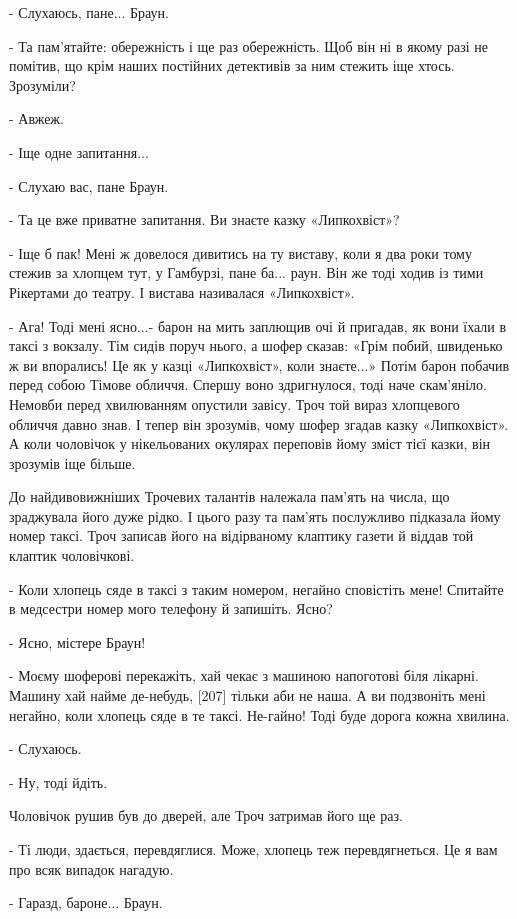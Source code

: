 - Слухаюсь, пане... Браун.

- Та пам'ятайте: обережність і ще раз обережність. Щоб він ні в якому разі не помітив, що крім наших постійних детективів за ним стежить іще хтось. Зрозуміли?

- Авжеж.

- Іще одне запитання...

- Слухаю вас, пане Браун.

- Та це вже приватне запитання. Ви знаєте казку «Липкохвіст»?

- Іще б пак! Мені ж довелося дивитись на ту виставу, коли я два роки тому стежив за хлопцем тут, у Гамбурзі, пане ба... раун. Він же тоді ходив із тими Рікертами до театру. І вистава називалася «Липкохвіст».

- Ага! Тоді мені ясно...- барон на мить заплющив очі й пригадав, як вони їхали в таксі з вокзалу. Тім сидів поруч нього, а шофер сказав: «Грім побий, швиденько ж ви впорались! Це як у казці «Липкохвіст», коли знаєте...» Потім барон побачив перед собою Тімове обличчя. Спершу воно здригнулося, тоді наче скам'яніло. Немовби перед хвилюванням опустили завісу. Троч той вираз хлопцевого обличчя давно знав. І тепер він зрозумів, чому шофер згадав казку «Липкохвіст». А коли чоловічок у нікельованих окулярах переповів йому зміст тієї казки, він зрозумів іще більше.

До найдивовижніших Трочевих талантів належала пам'ять на числа, що зраджувала його дуже рідко. І цього разу та пам'ять послужливо підказала йому номер таксі. Троч записав його на відірваному клаптику газети й віддав той клаптик чоловічкові.

- Коли хлопець сяде в таксі з таким номером, негайно сповістіть мене! Спитайте в медсестри номер мого телефону й запишіть. Ясно?

- Ясно, містере Браун!

- Моєму шоферові перекажіть, хай чекає з машиною напоготові біля лікарні. Машину хай найме де-небудь, [207] тільки аби не наша. А ви подзвоніть мені негайно, коли хлопець сяде в те таксі. Не-гайно! Тоді буде дорога кожна хвилина.

- Слухаюсь.

- Ну, тоді йдіть.

Чоловічок рушив був до дверей, але Троч затримав його ще раз.

- Ті люди, здається, перевдяглися. Може, хлопець теж перевдягнеться. Це я вам про всяк випадок нагадую.

- Гаразд, бароне... Браун.


